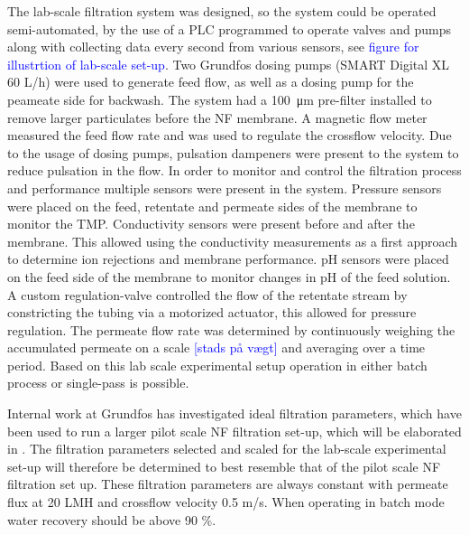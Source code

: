 The lab-scale filtration system was designed, 
so the system could be operated semi-automated, by the use of a PLC programmed to operate valves and pumps along with collecting data every second from various sensors, see \textcolor{blue}{figure for illustrtion of lab-scale set-up}.
Two Grundfos dosing pumps (SMART Digital XL 60 L/h) were used to generate feed flow, as well as a dosing pump for the peameate side for backwash.
The system had a \SI{100}{\micro\meter} pre-filter installed to remove larger particulates before the NF membrane.
A magnetic flow meter measured the feed flow rate and was used to regulate the crossflow velocity.
Due to the usage of dosing pumps, pulsation dampeners were present to the system to reduce pulsation in the flow.
In order to monitor and control the filtration process and performance multiple sensors were present in the system. 
Pressure sensors were placed on the feed, retentate and permeate sides of the membrane to monitor the TMP. 
Conductivity sensors were present before and after the membrane.
This allowed using the conductivity measurements as a first approach to determine ion rejections and membrane performance. 
pH sensors were placed on the feed side of the membrane to monitor changes in pH of the feed solution. 
A custom regulation-valve controlled the flow of the retentate stream by constricting the tubing via a motorized actuator, this allowed for pressure regulation. 
The permeate flow rate was determined by continuously weighing the accumulated permeate on a scale \textcolor{blue}{[stads på vægt]} and averaging over a time period.  
Based on this lab scale experimental setup operation in either batch process or single-pass is possible.

Internal work at Grundfos has investigated ideal filtration parameters, which have been used to run a larger pilot scale NF filtration set-up, which will be elaborated in . %
The filtration parameters selected and scaled for the lab-scale experimental set-up will therefore be determined to best resemble that of the pilot scale NF filtration set up.
These filtration parameters are always constant with permeate flux at 20 LMH and crossflow velocity 0.5 m/s. 
When operating in batch mode water recovery should be above 90 \%. 



